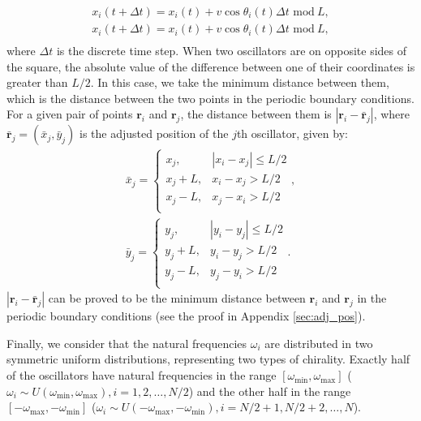 \documentclass[%
 aip,
 amsmath,amssymb,
 reprint,%
]{revtex4-1}
\begin{document}
\begin{equation}
    \begin{array}{c}
        x_i\left( t+\Delta t \right) =x_i\left( t \right) +v\cos \theta _i\left( t \right) \Delta t\,\,\mathrm{mod}\ L,\\
        x_i\left( t+\Delta t \right) =x_i\left( t \right) +v\cos \theta _i\left( t \right) \Delta t\,\,\mathrm{mod}\ L,\\
    \end{array}
\end{equation}
where $\Delta t$ is the discrete time step. When two oscillators are on opposite sides of the square, the absolute value of the difference between one of their coordinates is greater than $L/2$. In this case, we take the minimum distance between them, which is the distance between the two points in the periodic boundary conditions. For a given pair of points $\mathbf{r}_i$ and $\mathbf{r}_j$, the distance between them is $\left| \mathbf{r}_i-\bar{\mathbf{r}}_j \right|$, where $\bar{\mathbf{r}}_j=\left( \bar{x}_j,\bar{y}_j \right)$ is the adjusted position of the $j$th oscillator, given by:
\begin{eqnarray}\label{eq:adj_pos1}
    \bar{x}_j=\begin{cases}
        x_j,&		\left| x_i-x_j \right|\le L/2\\
        x_j+L,&		x_i-x_j>L/2\\
        x_j-L,&		x_j-x_i>L/2\\
    \end{cases},
    \\
    \bar{y}_j=\begin{cases}\label{eq:adj_pos2}
        y_j,&		\left| y_i-y_j \right|\le L/2\\
        y_j+L,&		y_i-y_j>L/2\\
        y_j-L,&		y_j-y_i>L/2\\
    \end{cases}.
\end{eqnarray}
$\left| \mathbf{r}_i-\bar{\mathbf{r}}_j \right|$ can be proved to be the minimum distance between $\mathbf{r}_i$ and $\mathbf{r}_j$ in the periodic boundary conditions (see the proof in Appendix \ref{sec:adj_pos}).

Finally, we consider that the natural frequencies $\omega_i$ are distributed in two symmetric uniform distributions, representing two types of chirality. Exactly half of the oscillators have natural frequencies in the range $\left[ \omega _{\min},\omega _{\max} \right]$ ($\omega_i \sim U\left( \omega _{\min},\omega _{\max} \right), i=1,2,\ldots,N/2$) and the other half in the range $\left[ -\omega _{\max},-\omega _{\min} \right]$ ($\omega_i \sim U\left( -\omega _{\max},-\omega _{\min} \right), i=N/2+1,N/2+2,\ldots,N$).
\end{document}
